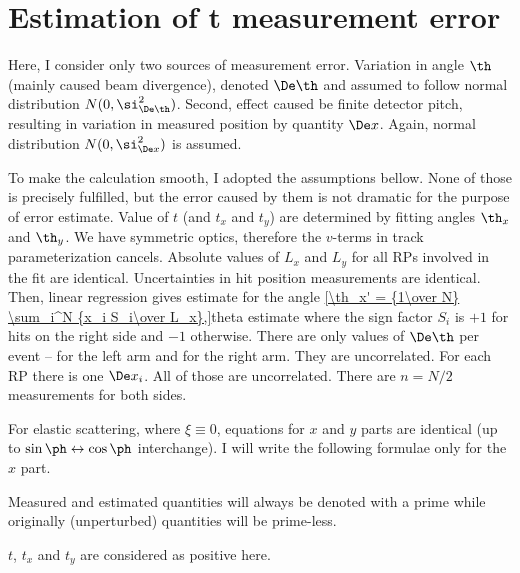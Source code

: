 \vfil\eject
\section{Estimation of t measurement error}

Here, I consider only two sources of measurement error. Variation in angle $\th$ (mainly caused beam divergence), denoted $\De\th$ and assumed to follow normal distribution $N(0, \si^2_{\De\th})$. Second, effect caused be finite detector pitch, resulting in variation in measured position by quantity $\De x$. Again, normal distribution $N(0, \si^2_{\De x})$ is assumed.

To make the calculation smooth, I adopted the assumptions bellow. None of those is precisely fulfilled, but the error caused by them is not dramatic for the purpose of error estimate.
\bitm
\itm Value of $t$ (and $t_x$ and $t_y$) are determined by fitting angles $\th_x$ and $\th_y$.
\itm We have symmetric optics, therefore the $v$-terms in track parameterization cancels.
\itm Absolute values of $L_x$ and $L_y$ for all RPs involved in the fit are identical.
\itm Uncertainties in hit position measurements are identical. Then, linear regression gives estimate for the angle
\eqref{\th_x' = {1\over N} \sum_i^N {x_i S_i\over L_x},}{theta estimate}
where the sign factor $S_i$ is $+1$ for hits on the right side and $-1$ otherwise.
\itm There are only values of $\De\th$ per event -- for the left arm and for the right arm. They are uncorrelated.
\itm For each RP there is one $\De x_i$. All of those are uncorrelated.
\itm There are $n = N/2$ measurements for both sides.
\eitm

For elastic scattering, where $\xi\equiv0$, equations for $x$ and $y$ parts are identical (up to $\sin\ph\leftrightarrow\cos\ph$ interchange). I will write the following formulae only for the $x$ part.

Measured and estimated quantities will always be denoted with a prime while originally (unperturbed) quantities will be prime-less.

$t$, $t_x$ and $t_y$ are considered as positive here.

